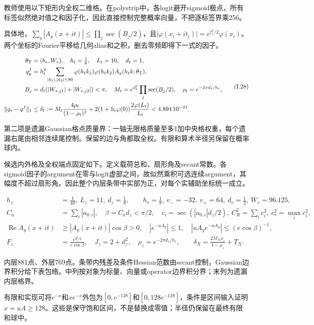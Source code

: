 \documentclass[11pt,a4paper]{article}
\begin{document}
教师使用以下矩形内全权二维格。在polystrip中，各logit避开sigmoid极点，所有标签似然绝对值之和因子化，因此直接控制完整概率向量，不把逐标签界乘256。

具体地，\(\sum_y|A_y(x+it)|\le\prod_j\sec(B_j/2)\)，且\(|\varphi(x_i+it_i)|=e^{t_i^2/2}\varphi(x_i)\)。两个坐标的Fourier平移给几何alias和之积，删去零频即得下一式的因子。

\[
\begin{aligned}
\theta_{\rm T}&=(b_*,W_*),\quad h_t=\tfrac18,\quad L_t=10,\quad d_t=1,\\
q_y^f&=h_t^2\sum_{|k_1|,|k_2|\le80}\varphi(h_tk_1)\varphi(h_tk_2)A_y(h_tk;\theta_{\rm T}),\\
B_j&=d_t(|W_{*,j1}|+|W_{*,j2}|)<\pi,\quad
M_t=e^{d_t^2}\prod_j\sec(B_j/2),\quad \rho_t=e^{-2\pi d_t/h_t},\\
\|q_*-q^f\|_1&\le\delta_t:=M_t\frac{4\rho_t}{(1-\rho_t)^2}
+2(1+h_t\varphi(0))\frac{2\varphi(L_t)}{L_t}<4.894\,10^{-21}.
\end{aligned}
\tag{I.28}
\]

第二项是遗漏Gaussian格点质量界：一轴无限格质量至多1加中央格权重，每个遗漏右尾由相邻连续尾控制。保留的边与角都取全权。有限和算术半径另保留在概率球内。

候选内外格及全权端点固定如下。定义载荷总和、扇形角及secant常数。各sigmoid因子的argument在零与logit虚部之间，故似然乘积可选连续argument，其幅度不超过扇形角。因此整个内层条带中实部为正，对每个实辅助坐标统一成立。

\[
\begin{aligned}
h_z&=\tfrac1{40},\ L_z=11,\ d_z=\tfrac18,\qquad
h_v=\tfrac18,\ v_-=-32,\ v_+=64,\ d_v=\tfrac12,\ W_v=96.125,\\
C_a&=\sum_i|a_{0,i}|,\quad\beta=C_ad_z<\pi/2,\quad
c_i=\sec(|a_{0,i}|d_z/2),\ C_R^2=\sum_i c_i^2,\ c_*^2=\max_i c_i^2,\\
\operatorname{Re}A_y(x+it)&\ge|A_y(x+it)|\cos\beta>0,\quad
|e^{-uA_y}|\le1,\quad |uA_ye^{-uA_y}|\le(e\cos\beta)^{-1},\\
F_z&=\frac{e^{d_z^2/2}}{e\cos\beta},\quad J_z=2+d_z^2,\quad
\rho_z=e^{-2\pi d_z/h_z},\qquad
\delta_X=\frac{2M_X\rho_z}{1-\rho_z}+T_X.
\end{aligned}
\tag{I.29}
\]

内层881点、外层769点。条带内残差及条件Hessian范数由secant控制，Gaussian边界积分给下表包络。中列按对象为标量、向量或operator边界积分界；末列为遗漏内层格界。

有限和实现可将\(e^{-x}\)和\(xe^{-x}\)外包为\([0,e^{-128}]\)和\([0,128e^{-128}]\)，条件是区间输入证明\(x=uA\ge128\)。这些是保守饱和区间，不是替换成零值；半径仍保留在最终有限和球中。
\end{document}
